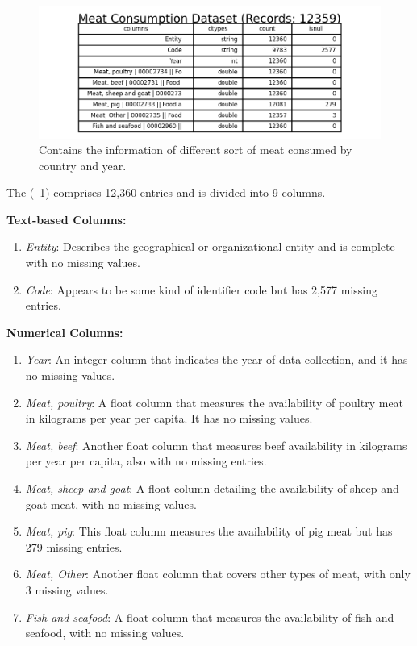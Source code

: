         \subsection{\duDescribeTheData}
            \begin{figure}[H]
                \centering
                \includegraphics[scale=1.3]{images/du_meat_consumption_dataset}
                \caption{Contains the information of different sort of meat consumed by country and year.}
                \label{fig:du-meat-datasets}
            \end{figure}

            The \textit{\dsMeat} (\figurename~\ref{fig:du-meat-datasets}) comprises 12,360 entries and is divided into 9 columns.

            \textbf{Text-based Columns:}
            \begin{enumerate}
                \item \textit{Entity}: Describes the geographical or organizational entity and is complete with no missing values.
                \item \textit{Code}: Appears to be some kind of identifier code but has 2,577 missing entries.
            \end{enumerate}

            \textbf{Numerical Columns:}
            \begin{enumerate}
                \item \textit{Year}: An integer column that indicates the year of data collection, and it has no missing values.
                \item \textit{Meat, poultry}: A float column that measures the availability of poultry meat in kilograms per year per capita. It has no missing values.
                \item \textit{Meat, beef}: Another float column that measures beef availability in kilograms per year per capita, also with no missing entries.
                \item \textit{Meat, sheep and goat}: A float column detailing the availability of sheep and goat meat, with no missing values.
                \item \textit{Meat, pig}: This float column measures the availability of pig meat but has 279 missing entries.
                \item \textit{Meat, Other}: Another float column that covers other types of meat, with only 3 missing values.
                \item \textit{Fish and seafood}: A float column that measures the availability of fish and seafood, with no missing values.
            \end{enumerate}


